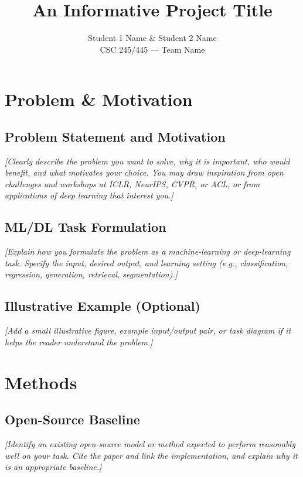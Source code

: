 \documentclass[11pt]{article}
\title{\textbf{An Informative Project Title}}
\author{Student 1 Name \quad \& \quad Student 2 Name \\
        CSC 245/445 --- Team Name}
\date{}
\newcommand{\prompt}[1]{\textcolor{promptgray}{\textit{[#1]}}}
\begin{document}
\maketitle
\vspace{-1.5em}

\section{Problem \& Motivation}

\subsection{Problem Statement and Motivation}
\prompt{Clearly describe the problem you want to solve, why it is important,
who would benefit, and what motivates your choice. You may draw inspiration
from open challenges and workshops at ICLR, NeurIPS, CVPR, or ACL, or from
applications of deep learning that interest you.}

\subsection{ML/DL Task Formulation}
\prompt{Explain how you formulate the problem as a machine-learning or
deep-learning task. Specify the input, desired output, and learning setting
(e.g., classification, regression, generation, retrieval, segmentation).}

\subsection{Illustrative Example (Optional)}
\prompt{Add a small illustrative figure, example input/output pair, or task
diagram if it helps the reader understand the problem.}


\section{Methods}

\subsection{Open-Source Baseline}
\prompt{Identify an existing open-source model or method expected to
perform reasonably well on your task. Cite the paper and link the
implementation, and explain why it is an appropriate baseline.}
\end{document}
